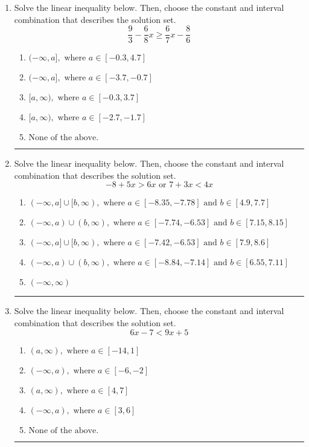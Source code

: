 \documentclass[14pt]{extbook}
\newcommand{\litem}[1]{\item#1\hspace*{-1cm}\rule{\textwidth}{0.4pt}}
\begin{document}
\begin{enumerate}
{\begin{enumerate}[label=\Alph*.]
\end{enumerate} }
\litem{
Solve the linear inequality below. Then, choose the constant and interval combination that describes the solution set.\[ \frac{9}{3} - \frac{6}{8} x \geq \frac{6}{7} x - \frac{8}{6} \]\begin{enumerate}[label=\Alph*.]
\item \( (-\infty, a], \text{ where } a \in [-0.3, 4.7] \)
\item \( (-\infty, a], \text{ where } a \in [-3.7, -0.7] \)
\item \( [a, \infty), \text{ where } a \in [-0.3, 3.7] \)
\item \( [a, \infty), \text{ where } a \in [-2.7, -1.7] \)
\item \( \text{None of the above}. \)

\end{enumerate} }
\litem{
Solve the linear inequality below. Then, choose the constant and interval combination that describes the solution set.\[ -8 + 5 x > 6 x \text{ or } 7 + 3 x < 4 x \]\begin{enumerate}[label=\Alph*.]
\item \( (-\infty, a] \cup [b, \infty), \text{ where } a \in [-8.35, -7.78] \text{ and } b \in [4.9, 7.7] \)
\item \( (-\infty, a) \cup (b, \infty), \text{ where } a \in [-7.74, -6.53] \text{ and } b \in [7.15, 8.15] \)
\item \( (-\infty, a] \cup [b, \infty), \text{ where } a \in [-7.42, -6.53] \text{ and } b \in [7.9, 8.6] \)
\item \( (-\infty, a) \cup (b, \infty), \text{ where } a \in [-8.84, -7.14] \text{ and } b \in [6.55, 7.11] \)
\item \( (-\infty, \infty) \)

\end{enumerate} }
\litem{
Solve the linear inequality below. Then, choose the constant and interval combination that describes the solution set.\[ 6x -7 < 9x + 5 \]\begin{enumerate}[label=\Alph*.]
\item \( (a, \infty), \text{ where } a \in [-14, 1] \)
\item \( (-\infty, a), \text{ where } a \in [-6, -2] \)
\item \( (a, \infty), \text{ where } a \in [4, 7] \)
\item \( (-\infty, a), \text{ where } a \in [3, 6] \)
\item \( \text{None of the above}. \)


\end{enumerate}}
\end{enumerate}
\end{document}
